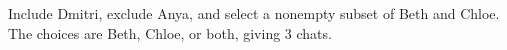 Include Dmitri, exclude Anya, and select a nonempty subset of Beth and Chloe. The choices are Beth, Chloe, or both, giving $\boxed3$ chats.
